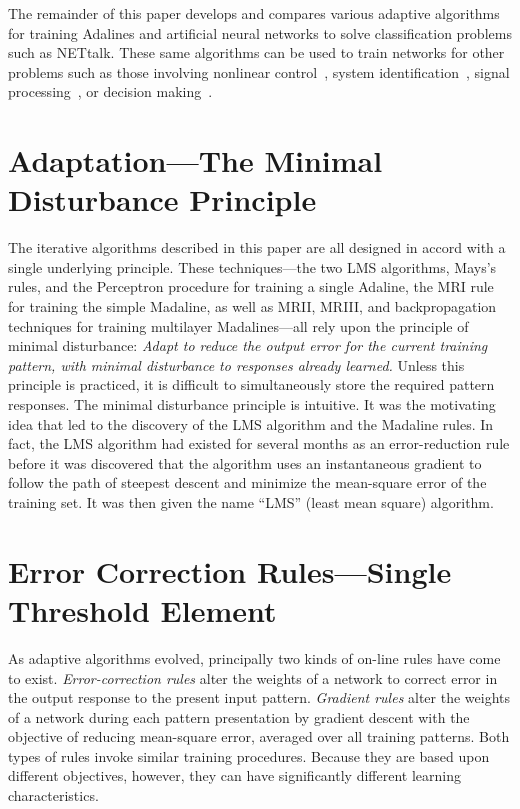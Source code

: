\documentclass[10pt,twocolumn]{article}
\begin{document}
The remainder of this paper develops and compares various adaptive algorithms for
training Adalines and artificial neural networks to solve classification problems
such as NETtalk. These same algorithms can be used to train networks for other
problems such as those involving nonlinear control~\cite{nguyen90}, system
identification~\cite{nguyen90,narendra}, signal processing~\cite{asp}, or
decision making~\cite{bradshaw}.

\section{Adaptation---The Minimal Disturbance Principle}
The iterative algorithms described in this paper are all designed in accord with
a single underlying principle. These techniques---the two LMS algorithms, Mays's
rules, and the Perceptron procedure for training a single Adaline, the MRI rule
for training the simple Madaline, as well as MRII, MRIII, and backpropagation
techniques for training multilayer Madalines---all rely upon the principle of
minimal disturbance: \textit{Adapt to reduce the output error for the current
training pattern, with minimal disturbance to responses already learned.} Unless
this principle is practiced, it is difficult to simultaneously store the required
pattern responses. The minimal disturbance principle is intuitive. It was the
motivating idea that led to the discovery of the LMS algorithm and the Madaline
rules. In fact, the LMS algorithm had existed for several months as an
error-reduction rule before it was discovered that the algorithm uses an
instantaneous gradient to follow the path of steepest descent and minimize the
mean-square error of the training set. It was then given the name ``LMS'' (least
mean square) algorithm.

\section{Error Correction Rules---Single Threshold Element}
As adaptive algorithms evolved, principally two kinds of on-line rules have come
to exist. \textit{Error-correction rules} alter the weights of a network to
correct error in the output response to the present input pattern.
\textit{Gradient rules} alter the weights of a network during each pattern
presentation by gradient descent with the objective of reducing mean-square
error, averaged over all training patterns. Both types of rules invoke similar
training procedures. Because they are based upon different objectives, however,
they can have significantly different learning characteristics.
\end{document}

